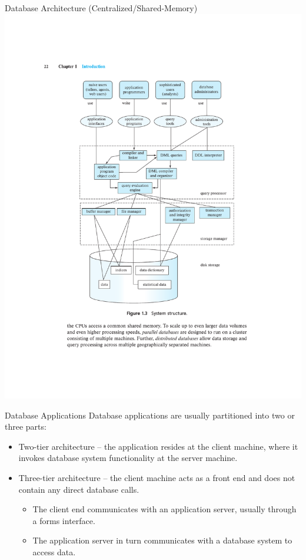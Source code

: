 \documentclass{beamer}
\begin{document}
\begin{frame}{Database Architecture (Centralized/Shared-Memory)}
    \centering 
    \includegraphics[width=0.85\textheight, trim={5.25cm 6.75cm 4.9cm 9.55cm}, clip]{figures/arch2}
\end{frame}

\begin{frame}{Database Applications}
Database applications are usually partitioned into two or three parts:
    \begin{itemize}
        \item Two-tier architecture --  the application resides at the client machine, where it invokes database system functionality at the server machine.
        \item Three-tier architecture -- the client machine acts as a front end and does not contain any direct database calls.
        \begin{itemize}
            \item The client end communicates with an application server, usually through a forms interface.  
            \item The application server in turn communicates with a database system to access data.
        \end{itemize}
    \end{itemize}
\end{frame}
\end{document}
